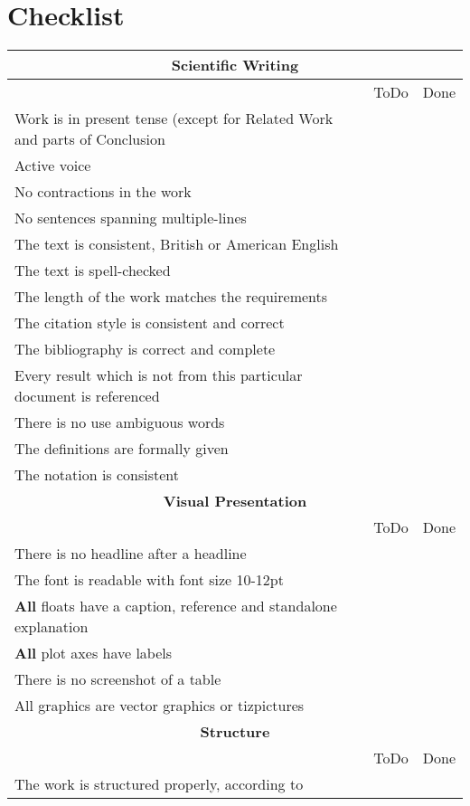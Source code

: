\newcommand{\form}{\begin{Form}\ChoiceMenu[name=X\alph{formcounter}, radio,radiosymbol=\ding{52}]{}{ }\end{Form}&\begin{Form}\ChoiceMenu[name=X\alph{formcounter}, radio,radiosymbol=\ding{52}]{}{ }\end{Form}\stepcounter{formcounter}}

\newcommand{\checklistheadline}[1]{%
	\multicolumn{3}{c}{#1}\\\hline
	&ToDo&Done}
\section{Checklist}
\begin{table}[h!]
	\begin{center}
		\renewcommand{\arraystretch}{1.3}
	\begin{tabular}{p{}cc}
		\checklistheadline{\textbf{Scientific Writing}}\\
		Work is in present tense (except for Related Work and parts of Conclusion&\form\\
		Active voice  &\form\\
		No contractions in the work&\form\\
		No sentences spanning multiple-lines&\form\\
		The text is consistent, British or American English&\form\\
		The text is spell-checked&\form\\
		
		The length of the work matches the requirements&\form\\
		The citation style is consistent and correct&\form\\
		The bibliography is correct and complete&\form\\
		Every result which is not from this particular document is referenced&\form\\
		
		There is no use ambiguous words &\form\\
		The definitions are formally given &\form\\
		The notation is consistent &\form\\
		\checklistheadline{\textbf{Visual Presentation}}\\
		There is no headline after a headline&\form\\
		The font is readable with font size 10-12pt&\form\\
		\textbf{All} floats have a caption, reference and standalone explanation&\form\\
		\textbf{All} plot axes have labels&\form\\
		There is no screenshot of a table&\form\\
		All graphics are vector graphics or tizpictures&\form\\
		\checklistheadline{\textbf{Structure}}\\
		The work is structured properly, according to \Cref{sec:structure}&\form\\


\end{tabular}
\end{center}
\end{table}
